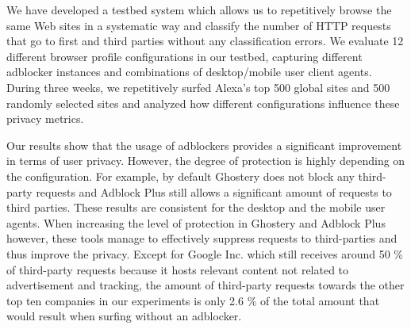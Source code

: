 \documentclass[compsoc, conference, letterpaper, 10pt, times]{IEEEtran}
\begin{document}
We have developed a testbed system which allows us to repetitively browse the same Web sites in a systematic way and classify the number of HTTP requests that go to first and third parties without any classification errors.
We evaluate 12 different browser profile configurations in our testbed, capturing different adblocker instances and combinations of desktop/mobile user client agents. During three weeks, we repetitively surfed Alexa's top 500 global sites and 500 randomly selected sites and analyzed how different configurations influence these privacy metrics.


Our results show that the usage of adblockers provides a significant improvement in terms of user privacy.
However, the degree of protection is highly depending on the configuration. For example, by default Ghostery does not block any third-party requests and Adblock Plus still allows a significant amount of requests to third parties. These results are consistent for the desktop and the mobile user agents. When increasing the level of protection in Ghostery and Adblock Plus however, these tools manage to effectively suppress requests to third-parties and thus improve the privacy. Except for Google Inc. which still receives around 50 \% of third-party requests because it hosts relevant content not related to advertisement and tracking, the amount of third-party requests towards the other top ten companies in our experiments is only 2.6 \% of the total amount that would result when surfing without an adblocker.



\end{document}
